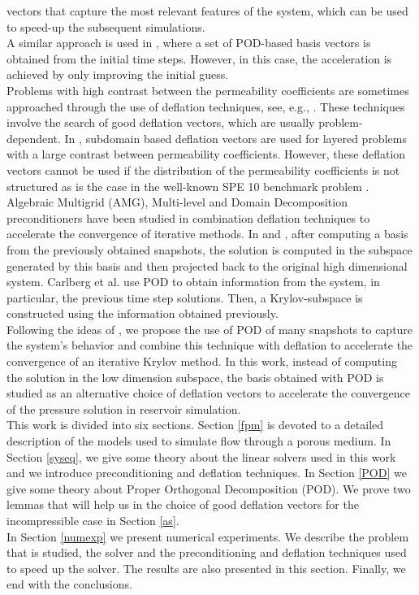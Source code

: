 \documentclass[review]{elsarticle}
\begin{document}
vectors that capture the most relevant features of the system, which can be used to speed-up the subsequent simulations.\\
A similar approach is used in \cite{Mark06}, where a set of POD-based 
basis vectors is obtained from the initial time steps. However, in this case, the acceleration is 
achieved by only improving the initial guess.\\
Problems with high contrast between the permeability coefficients are sometimes approached through the 
use of deflation techniques, see, e.g., \cite{Vuik99}. These techniques involve the search 
of good deflation vectors, which are usually problem-dependent. In \cite{Vuik99}, subdomain based deflation 
vectors are used for layered problems with a large contrast between permeability coefficients. However, 
these deflation vectors cannot be used if the distribution of the permeability coefficients  is not 
structured as is the case in the well-known SPE 10 benchmark problem \cite{Christie01}.\\
Algebraic Multigrid (AMG)\cite{Klie07}, Multi-level and Domain Decomposition \cite{Tang09} preconditioners have been studied in combination deflation techniques to accelerate the convergence of iterative methods.
In \cite{Astrid11,Mark06} and \cite{Pasetto16}, after computing a basis from the 
previously obtained snapshots, the solution is computed in the subspace generated by this basis and then projected 
back to the original high dimensional system. Carlberg et al. \cite{Carlberg15} use POD to obtain information 
from the system, in particular, the previous time step solutions. Then, a Krylov-subspace is constructed using the 
information obtained previously.\\
Following the ideas of \cite{Astrid11,Mark06,Pasetto16,Carlberg15}, we propose the use of POD of many snapshots 
to capture the system's behavior and combine this technique with deflation to accelerate the convergence of 
an iterative Krylov method.
In this work, instead of computing the solution in the low dimension subspace, the basis obtained with POD is 
studied as an alternative choice of deflation vectors 
to accelerate the convergence of the pressure solution in reservoir simulation.  \\
This work is divided into six sections. 
  Section \ref{fpm} is devoted to a detailed description of the models used to simulate flow through a porous medium. In Section \ref{syseq}, we give some theory about the linear solvers used in this work and we introduce preconditioning 
  and deflation techniques. 
  In Section \ref{POD} we give some theory about Proper Orthogonal Decomposition (POD). We prove two lemmas that will help us in the choice of good deflation vectors for the 
  incompressible case in Section \ref{as}.\\
 In Section \ref{numexp} we present numerical experiments. We describe the problem that is studied, the solver and the preconditioning and deflation techniques used to speed up the solver. The results are also presented
 in this section.
 Finally, we end with the conclusions.
\end{document}
